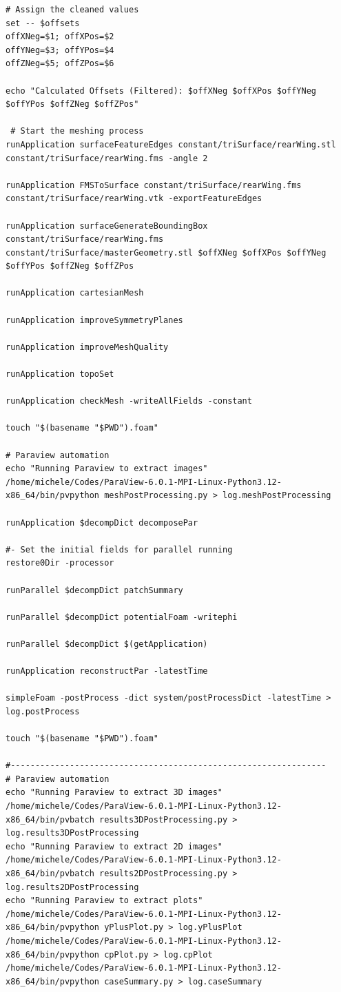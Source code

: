 \documentclass[12pt,a4paper]{article}
\begin{document}
\begin{lstlisting}
# Assign the cleaned values
set -- $offsets
offXNeg=$1; offXPos=$2
offYNeg=$3; offYPos=$4
offZNeg=$5; offZPos=$6

echo "Calculated Offsets (Filtered): $offXNeg $offXPos $offYNeg $offYPos $offZNeg $offZPos"

 # Start the meshing process
runApplication surfaceFeatureEdges constant/triSurface/rearWing.stl constant/triSurface/rearWing.fms -angle 2

runApplication FMSToSurface constant/triSurface/rearWing.fms constant/triSurface/rearWing.vtk -exportFeatureEdges
 
runApplication surfaceGenerateBoundingBox constant/triSurface/rearWing.fms constant/triSurface/masterGeometry.stl $offXNeg $offXPos $offYNeg $offYPos $offZNeg $offZPos

runApplication cartesianMesh

runApplication improveSymmetryPlanes

runApplication improveMeshQuality

runApplication topoSet

runApplication checkMesh -writeAllFields -constant

touch "$(basename "$PWD").foam"

# Paraview automation
echo "Running Paraview to extract images"
/home/michele/Codes/ParaView-6.0.1-MPI-Linux-Python3.12-x86_64/bin/pvpython meshPostProcessing.py > log.meshPostProcessing

runApplication $decompDict decomposePar

#- Set the initial fields for parallel running
restore0Dir -processor

runParallel $decompDict patchSummary

runParallel $decompDict potentialFoam -writephi

runParallel $decompDict $(getApplication)

runApplication reconstructPar -latestTime

simpleFoam -postProcess -dict system/postProcessDict -latestTime > log.postProcess

touch "$(basename "$PWD").foam"

#----------------------------------------------------------------
# Paraview automation
echo "Running Paraview to extract 3D images"
/home/michele/Codes/ParaView-6.0.1-MPI-Linux-Python3.12-x86_64/bin/pvbatch results3DPostProcessing.py > log.results3DPostProcessing
echo "Running Paraview to extract 2D images"
/home/michele/Codes/ParaView-6.0.1-MPI-Linux-Python3.12-x86_64/bin/pvbatch results2DPostProcessing.py > log.results2DPostProcessing
echo "Running Paraview to extract plots"
/home/michele/Codes/ParaView-6.0.1-MPI-Linux-Python3.12-x86_64/bin/pvpython yPlusPlot.py > log.yPlusPlot
/home/michele/Codes/ParaView-6.0.1-MPI-Linux-Python3.12-x86_64/bin/pvpython cpPlot.py > log.cpPlot
/home/michele/Codes/ParaView-6.0.1-MPI-Linux-Python3.12-x86_64/bin/pvpython caseSummary.py > log.caseSummary


\end{lstlisting}
\end{document}
